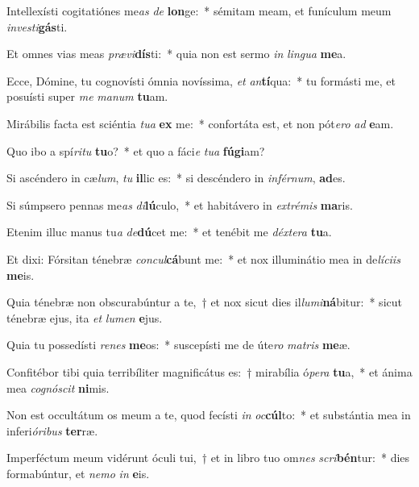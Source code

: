 \item Intellexísti cogitatiónes me\textit{as} \textit{de} \textbf{lon}ge:~* sémitam meam, et funículum meum \textit{in}\textit{ves}\textit{ti}\textbf{gás}ti.
\item Et omnes vias meas \textit{præ}\textit{vi}\textbf{dís}ti:~* quia non est sermo \textit{in} \textit{lin}\textit{gua} \textbf{me}a.
\item Ecce, Dómine, tu cognovísti ómnia novíssima, \textit{et} \textit{an}\textbf{tí}qua:~* tu formásti me, et posuísti super \textit{me} \textit{ma}\textit{num} \textbf{tu}am.
\item Mirábilis facta est sciéntia \textit{tu}\textit{a} \textbf{ex} me:~* confortáta est, et non pót\textit{e}\textit{ro} \textit{ad} \textbf{e}am.
\item Quo ibo a spí\textit{ri}\textit{tu} \textbf{tu}o?~* et quo a fáci\textit{e} \textit{tu}\textit{a} \textbf{fú}\textbf{gi}am?
\item Si ascéndero in cæ\textit{lum}, \textit{tu} \textbf{il}lic es:~* si descéndero in \textit{in}\textit{fér}\textit{num}, \textbf{ad}es.
\item Si súmpsero pennas me\textit{as} \textit{di}\textbf{lú}culo,~* et habitávero in \textit{ex}\textit{tré}\textit{mis} \textbf{ma}ris.
\item Etenim illuc manus tu\textit{a} \textit{de}\textbf{dú}cet me:~* et tenébit me \textit{déx}\textit{te}\textit{ra} \textbf{tu}a.
\item Et dixi: Fórsitan ténebræ \textit{con}\textit{cul}\textbf{cá}bunt me:~* et nox illuminátio mea in de\textit{lí}\textit{ci}\textit{is} \textbf{me}is.
\item Quia ténebræ non obscurabúntur a te,~† et nox sicut dies il\textit{lu}\textit{mi}\textbf{ná}bitur:~* sicut ténebræ ejus, ita \textit{et} \textit{lu}\textit{men} \textbf{e}jus.
\item Quia tu possedísti \textit{re}\textit{nes} \textbf{me}os:~* suscepísti me de úte\textit{ro} \textit{ma}\textit{tris} \textbf{me}æ.
\item Confitébor tibi quia terribíliter magnificátus es:~† mirabília ó\textit{pe}\textit{ra} \textbf{tu}a,~* et ánima mea \textit{co}\textit{gnó}\textit{scit} \textbf{ni}mis.
\item Non est occultátum os meum a te, quod fecísti \textit{in} \textit{oc}\textbf{cúl}to:~* et substántia mea in inferi\textit{ó}\textit{ri}\textit{bus} \textbf{ter}ræ.
\item Imperféctum meum vidérunt óculi tui,~† et in libro tuo om\textit{nes} \textit{scri}\textbf{bén}tur:~* dies formabúntur, et \textit{ne}\textit{mo} \textit{in} \textbf{e}is.
